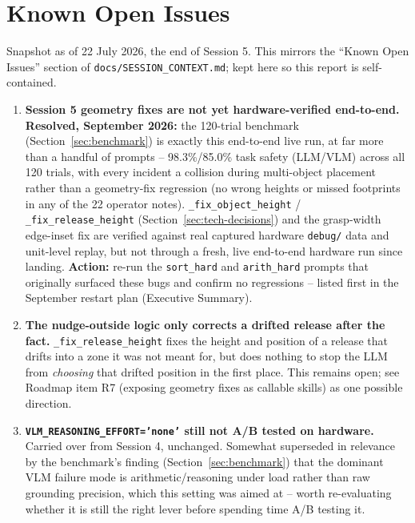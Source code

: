 \section{Known Open Issues}
\label{sec:open-issues}

Snapshot as of 22 July 2026, the end of Session 5. This mirrors the ``Known
Open Issues'' section of \texttt{docs/SESSION\_CONTEXT.md}; kept here so this
report is self-contained.

\begin{enumerate}[label=\textbf{I\arabic*.}, leftmargin=1.6cm]

  \item \textbf{Session 5 geometry fixes are not yet hardware-verified
    end-to-end.} \textbf{Resolved, September 2026:} the 120-trial benchmark
    (Section~\ref{sec:benchmark}) is exactly this end-to-end live run, at
    far more than a handful of prompts -- 98.3\%/85.0\% task safety (LLM/VLM)
    across all 120 trials, with every incident a collision during
    multi-object placement rather than a geometry-fix regression (no wrong
    heights or missed footprints in any of the 22 operator notes).
    \texttt{\_fix\_object\_height} / \texttt{\_fix\_release\_height}
    (Section~\ref{sec:tech-decisions}) and the grasp-width edge-inset fix are
    verified against real captured hardware \texttt{debug/} data and
    unit-level replay, but not through a fresh, live end-to-end hardware run
    since landing. \textbf{Action:} re-run the \texttt{sort\_hard} and
    \texttt{arith\_hard} prompts that originally surfaced these bugs and
    confirm no regressions -- listed first in the September restart plan
    (Executive Summary).

  \item \textbf{The nudge-outside logic only corrects a drifted release
    after the fact.} \texttt{\_fix\_release\_height} fixes the height and
    position of a release that drifts into a zone it was not meant for, but
    does nothing to stop the LLM from \emph{choosing} that drifted position
    in the first place. This remains open; see Roadmap item R7 (exposing
    geometry fixes as callable skills) as one possible direction.

  \item \textbf{\texttt{VLM\_REASONING\_EFFORT='none'} still not A/B tested
    on hardware.} Carried over from Session 4, unchanged. Somewhat
    superseded in relevance by the benchmark's finding
    (Section~\ref{sec:benchmark}) that the dominant VLM failure mode is
    arithmetic/reasoning under load rather than raw grounding precision,
    which this setting was aimed at -- worth re-evaluating whether it is
    still the right lever before spending time A/B testing it.


\end{enumerate}
